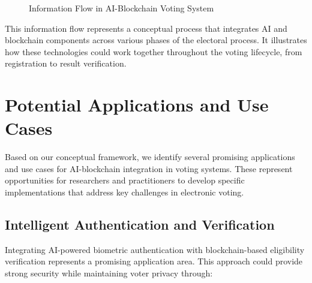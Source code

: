\documentclass[conference]{IEEEtran}
\begin{document}
\begin{figure}[!htb]
\centering
{}
\caption{Information Flow in AI-Blockchain Voting System}
\label{fig:workflow}
\end{figure}

This information flow represents a conceptual process that integrates AI and blockchain components across various phases of the electoral process. It illustrates how these technologies could work together throughout the voting lifecycle, from registration to result verification.

\section{Potential Applications and Use Cases}
Based on our conceptual framework, we identify several promising applications and use cases for AI-blockchain integration in voting systems. These represent opportunities for researchers and practitioners to develop specific implementations that address key challenges in electronic voting.

\subsection{Intelligent Authentication and Verification}
Integrating AI-powered biometric authentication with blockchain-based eligibility verification represents a promising application area. This approach could provide strong security while maintaining voter privacy through:
\end{document}
